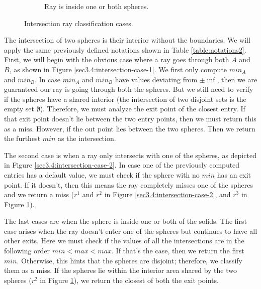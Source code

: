 \documentclass[a4paper,11pt,oneside]{article}
\begin{document}
\begin{figure}[ht]
\begin{subfigure}[b]{0.3\textwidth}
		\caption{Ray is inside one or both spheres.}
		\label{sec3.4:intersection-case-3}
	\end{subfigure}
	\caption{Intersection ray classification cases.}
	\label{sec3.4:sphere-intersection}
\end{figure}

The intersection of two spheres is their interior without the boundaries. We will apply the same previously defined notations shown in Table \ref{table:notations2}. First, we will begin with the obvious case where a ray goes through both $A$ and $B$, as shown in Figure \ref{sec3.4:intersection-case-1}. We first only compute $min_A$ and $min_B$. In case $min_A$ and $min_B$ have values deviating from $\pm\inf$, then we are guaranteed our ray is going through both the spheres. But we still need to verify if the spheres have a shared interior (the intersection of two disjoint sets is the empty set $\emptyset$). Therefore, we must analyze the exit point of the closest entry. If that exit point doesn't lie between the two entry points, then we must return this as a miss. However, if the out point lies between the two spheres. Then we return the furthest $min$ as the intersection. 

The second case is when a ray only intersects with one of the spheres, as depicted in Figure \ref{sec3.4:intersection-case-2}. In case one of the previously computed entries has a default value, we must check if the sphere with no $min$ has an exit point. If it doesn't, then this means the ray completely misses one of the spheres and we return a miss ($r^1$ and $r^2$ in Figure \ref{sec3.4:intersection-case-2}, and $r^3$ in Figure \ref{sec3.4:intersection-case-3}). 

The last cases are when the sphere is inside one or both of the solids. The first case arises when the ray doesn't enter one of the spheres but continues to have all other exits. Here we must check if the values of all the intersections are in the following order $min < max < max$. If that's the case, then we return the first $min$. Otherwise, this hints that the spheres are disjoint; therefore, we classify them as a miss. If the spheres lie within the interior area shared by the two spheres ($r^2$ in Figure \ref{sec3.4:intersection-case-3}), we return the closest of both the exit points.
\end{document}
